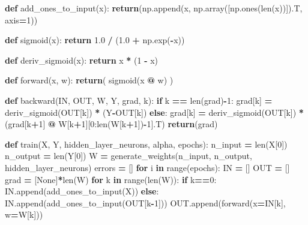 \documentclass[
]{book}
\newenvironment{Shaded}{\begin{snugshade}}{\end{snugshade}}
\newcommand{\BuiltInTok}[1]{#1}
\newcommand{\ControlFlowTok}[1]{\textcolor[rgb]{0.13,0.29,0.53}{\textbf{#1}}}
\newcommand{\DecValTok}[1]{\textcolor[rgb]{0.00,0.00,0.81}{#1}}
\newcommand{\FloatTok}[1]{\textcolor[rgb]{0.00,0.00,0.81}{#1}}
\newcommand{\KeywordTok}[1]{\textcolor[rgb]{0.13,0.29,0.53}{\textbf{#1}}}
\newcommand{\NormalTok}[1]{#1}
\newcommand{\OperatorTok}[1]{\textcolor[rgb]{0.81,0.36,0.00}{\textbf{#1}}}
\newcommand{\VariableTok}[1]{\textcolor[rgb]{0.00,0.00,0.00}{#1}}
\begin{document}
\begin{Shaded}
\begin{Highlighting}[]
\KeywordTok{def}\NormalTok{ add\_ones\_to\_input(x):}
  \ControlFlowTok{return}\NormalTok{(np.append(x, np.array([np.ones(}\BuiltInTok{len}\NormalTok{(x))]).T, axis}\OperatorTok{=}\DecValTok{1}\NormalTok{))}



\KeywordTok{def}\NormalTok{ sigmoid(x):}
  \ControlFlowTok{return} \FloatTok{1.0} \OperatorTok{/}\NormalTok{ (}\FloatTok{1.0} \OperatorTok{+}\NormalTok{ np.exp(}\OperatorTok{{-}}\NormalTok{x))}

\KeywordTok{def}\NormalTok{ deriv\_sigmoid(x):}
  \ControlFlowTok{return}\NormalTok{ x }\OperatorTok{*}\NormalTok{ (}\DecValTok{1} \OperatorTok{{-}}\NormalTok{ x)}


\KeywordTok{def}\NormalTok{ forward(x, w):}
  \ControlFlowTok{return}\NormalTok{( sigmoid(x }\OperatorTok{@}\NormalTok{ w) )}

\KeywordTok{def}\NormalTok{ backward(IN, OUT, W, Y, grad, k):}
  \ControlFlowTok{if}\NormalTok{ k }\OperatorTok{==} \BuiltInTok{len}\NormalTok{(grad)}\OperatorTok{{-}}\DecValTok{1}\NormalTok{:}
\NormalTok{    grad[k] }\OperatorTok{=}\NormalTok{ deriv\_sigmoid(OUT[k]) }\OperatorTok{*}\NormalTok{ (Y}\OperatorTok{{-}}\NormalTok{OUT[k])}
  \ControlFlowTok{else}\NormalTok{:}
\NormalTok{    grad[k] }\OperatorTok{=}\NormalTok{ deriv\_sigmoid(OUT[k]) }\OperatorTok{*}\NormalTok{(grad[k}\OperatorTok{+}\DecValTok{1}\NormalTok{] }\OperatorTok{@}\NormalTok{ W[k}\OperatorTok{+}\DecValTok{1}\NormalTok{][}\DecValTok{0}\NormalTok{:}\BuiltInTok{len}\NormalTok{(W[k}\OperatorTok{+}\DecValTok{1}\NormalTok{])}\OperatorTok{{-}}\DecValTok{1}\NormalTok{].T)}
  \ControlFlowTok{return}\NormalTok{(grad)}

\KeywordTok{def}\NormalTok{ train(X, Y, hidden\_layer\_neurons, alpha, epochs):}
\NormalTok{  n\_input }\OperatorTok{=} \BuiltInTok{len}\NormalTok{(X[}\DecValTok{0}\NormalTok{])}
\NormalTok{  n\_output }\OperatorTok{=} \BuiltInTok{len}\NormalTok{(Y[}\DecValTok{0}\NormalTok{])}
\NormalTok{  W }\OperatorTok{=}\NormalTok{ generate\_weights(n\_input, n\_output, hidden\_layer\_neurons)}
\NormalTok{  errors }\OperatorTok{=}\NormalTok{ []}
  \ControlFlowTok{for}\NormalTok{ i }\KeywordTok{in} \BuiltInTok{range}\NormalTok{(epochs):}
\NormalTok{    IN }\OperatorTok{=}\NormalTok{ []}
\NormalTok{    OUT }\OperatorTok{=}\NormalTok{ []}
\NormalTok{    grad }\OperatorTok{=}\NormalTok{ [}\VariableTok{None}\NormalTok{]}\OperatorTok{*}\BuiltInTok{len}\NormalTok{(W)}
    \ControlFlowTok{for}\NormalTok{ k }\KeywordTok{in} \BuiltInTok{range}\NormalTok{(}\BuiltInTok{len}\NormalTok{(W)):}
      \ControlFlowTok{if}\NormalTok{ k}\OperatorTok{==}\DecValTok{0}\NormalTok{:}
\NormalTok{        IN.append(add\_ones\_to\_input(X))}
      \ControlFlowTok{else}\NormalTok{:}
\NormalTok{        IN.append(add\_ones\_to\_input(OUT[k}\OperatorTok{{-}}\DecValTok{1}\NormalTok{]))}
\NormalTok{      OUT.append(forward(x}\OperatorTok{=}\NormalTok{IN[k], w}\OperatorTok{=}\NormalTok{W[k]))}
      

\end{Highlighting}
\end{Shaded}
\end{document}
